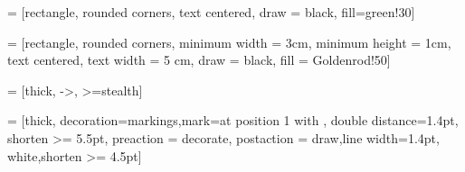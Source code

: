  = [rectangle, rounded corners, text centered, draw = black, fill=green!30]

 = [rectangle, rounded corners, minimum width = 3cm, minimum height = 1cm, text centered, text width = 5 cm, draw = black, fill = Goldenrod!50]

 = [thick, ->, >=stealth]

 = [thick, decoration={markings,mark=at position
   1 with {}},
   double distance=1.4pt, shorten >= 5.5pt,
   preaction = {decorate},
   postaction = {draw,line width=1.4pt, white,shorten >= 4.5pt}]

\usepackage{caption}
\usepackage{subcaption}